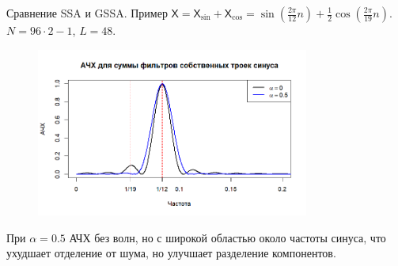 \documentclass[notheorems, handout]{beamer}
\newcommand{\GSSA}{\textbf{GSSA}}
\newcommand{\TS}{\mathsf{X}}
\begin{document}
	\begin{frame}{Сравнение SSA и GSSA. Пример}
		$\TS = \TS_{\sin} + \TS_{\cos} = \sin\left(\frac{2\pi}{12} n \right) + \frac{1}{2}\cos\left(\frac{2\pi}{19} n \right)$. $N = 96 \cdot 2 - 1$, $L = 48$.
		\begin{figure}[H]
			\centering
			\includegraphics[width=0.8\textwidth]{../Text/img/various_alphas_sin_cos.png}
			\label{fig:various_alphas_sin_cos}
		\end{figure}
		При \(\alpha = 0.5\) АЧХ без волн, но с широкой областью около частоты синуса, что ухудшает отделение от шума, но улучшает разделение компонентов.

	\end{frame}
	
\end{document}
